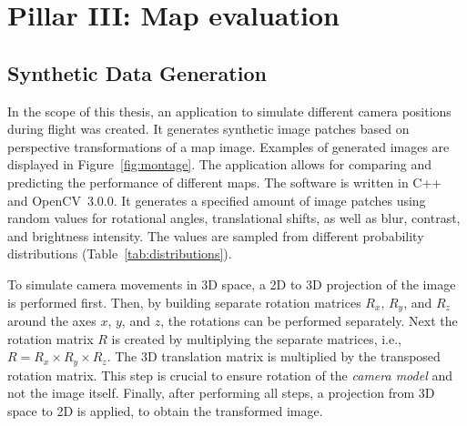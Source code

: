 \section{Pillar III: Map evaluation}
\label{sec:mapeval}

\subsection{Synthetic Data Generation}
\label{sec:syntheticdatageneration}

In the scope of this thesis, an application to simulate different
camera positions during flight was created. It generates synthetic
image patches based on perspective transformations of a map
image. Examples of generated images are displayed in
Figure~\ref{fig:montage}. The application allows for comparing and
predicting the performance of different maps. The software is written
in C++ and OpenCV~3.0.0.  It generates a specified amount of image
patches using random values for rotational angles, translational
shifts, as well as blur, contrast, and brightness intensity. The
values are sampled from different probability distributions
(Table~\ref{tab:distributions}).

To simulate camera movements in 3D space, a 2D to 3D projection of the
image is performed first. Then, by building separate rotation matrices
$R_x$, $R_y$, and $R_z$ around the axes $x$, $y$, and $z$, the
rotations can be performed separately. Next the rotation matrix $R$ is
created by multiplying the separate matrices, i.e.,
$R = R_x \times R_y \times R_z$. The 3D translation matrix is
multiplied by the transposed rotation matrix. This step is crucial to
ensure rotation of the \emph{camera model} and not the image
itself. Finally, after performing all steps, a projection from 3D
space to 2D is applied, to obtain the transformed image.

